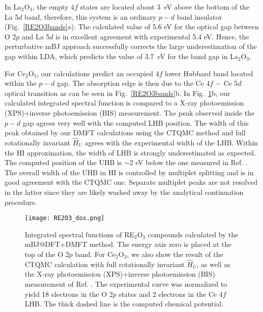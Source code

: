 \documentclass[aps,prb,twocolumn,amsmath,amssymb]{revtex4}
\begin{document}
In La$_{2}$O$_{3}$, the empty 4$f$ states are located about 3~eV above the bottom of the La 5$d$ band, therefore,  this system is an ordinary $p-d$ band insulator  (Fig.~\ref{RE2O3bands}a). The calculated value of 5.6 eV for the optical gap between O 2$p$ and La 5$d$ is in excellent agreement with  experimental 5.4 eV\cite{prokofiev1996}. Hence, 
the  perturbative mBJ  approach successfully corrects the large underestimation of the gap within LDA, which predicts\cite{Tomczak2007} the value of  3.7~eV for the band gap in La$_2$O$_3$. 



For Ce$_2$O$_3$, our calculations predict an occupied 4$f$ lower Hubbard band located within the $p-d$ gap. The absorption edge is then due to the Ce 4$f$ $-$ Ce 5$d$ optical transition as can be seen in Fig.~\ref{RE2O3bands}b.  In  Fig.~\ref{RE2O3DOS}b, our calculated integrated spectral function is compared to a X-ray photoemission (XPS)+inverse photoemission (BIS) measurement\cite{Allen1985}. The peak observed inside the $p-d$ gap agrees very well with the computed LHB position.  The width of this peak obtained by our DMFT calculations using the CTQMC method and full rotationally invariant $\hat{H}_{U}$ agrees with the experimental width of the LHB. Within the  HI  approximation, the width of LHB is strongly underestimated as expected. The computed position of the UHB is $\sim$2 eV below the one measured in Ref. . The overall width of the UHB  in HI is controlled by multiplet splitting and is in good agreement with the CTQMC one. Separate multiplet peaks are not resolved in the latter since they are likely washed away by the analytical continuation procedure. 


  \begin{figure}[!h]
	\begin{centering}
		\texttt{[image: RE2O3\_dos.png]}
		\par\end{centering}
	\caption{Integrated spectral functions of RE$_2$O$_3$ compounds calculated by the mBJ@DFT+DMFT method. The  energy axis zero is placed at the top of the O 2$p$ band. For Ce$_2$O$_3$, we also show the result of the CTQMC calculation with full rotationally invariant $\hat{H}_{U}$, as well as the X-ray photoemission (XPS)+inverse photoemission (BIS) measurement of Ref. . The experimental curve was normalized to yield 18 electrons in the O 2$p$ states and 2 electrons in the Ce 4$f$ LHB. The thick dashed line is the computed chemical potential.} 
	\label{RE2O3DOS} 
\end{figure}
 
\end{document}
